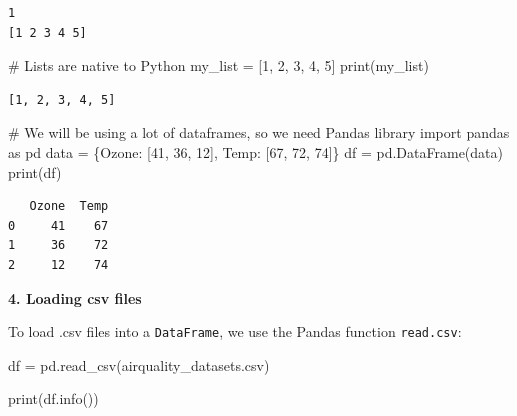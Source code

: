 \documentclass[
  letterpaper,
  DIV=11,
  numbers=noendperiod]{scrreprt}
\newenvironment{Shaded}{\begin{snugshade}}{\end{snugshade}}
\newcommand{\BuiltInTok}[1]{\textcolor[rgb]{0.00,0.23,0.31}{#1}}
\newcommand{\CommentTok}[1]{\textcolor[rgb]{0.37,0.37,0.37}{#1}}
\newcommand{\DecValTok}[1]{\textcolor[rgb]{0.68,0.00,0.00}{#1}}
\newcommand{\ImportTok}[1]{\textcolor[rgb]{0.00,0.46,0.62}{#1}}
\newcommand{\NormalTok}[1]{\textcolor[rgb]{0.00,0.23,0.31}{#1}}
\newcommand{\OperatorTok}[1]{\textcolor[rgb]{0.37,0.37,0.37}{#1}}
\newcommand{\StringTok}[1]{\textcolor[rgb]{0.13,0.47,0.30}{#1}}
\begin{document}
\begin{verbatim}
1
[1 2 3 4 5]
\end{verbatim}

\begin{Shaded}
\begin{Highlighting}[]
\CommentTok{\# Lists are native to Python}
\NormalTok{my\_list }\OperatorTok{=}\NormalTok{ [}\DecValTok{1}\NormalTok{, }\DecValTok{2}\NormalTok{, }\DecValTok{3}\NormalTok{, }\DecValTok{4}\NormalTok{, }\DecValTok{5}\NormalTok{]}
\BuiltInTok{print}\NormalTok{(my\_list)}
\end{Highlighting}
\end{Shaded}

\begin{verbatim}
[1, 2, 3, 4, 5]
\end{verbatim}

\begin{Shaded}
\begin{Highlighting}[]
\CommentTok{\# We will be using a lot of dataframes, so we need Pandas library}
\ImportTok{import}\NormalTok{ pandas }\ImportTok{as}\NormalTok{ pd}
\NormalTok{data }\OperatorTok{=}\NormalTok{ \{}\StringTok{\textquotesingle{}Ozone\textquotesingle{}}\NormalTok{: [}\DecValTok{41}\NormalTok{, }\DecValTok{36}\NormalTok{, }\DecValTok{12}\NormalTok{], }\StringTok{\textquotesingle{}Temp\textquotesingle{}}\NormalTok{: [}\DecValTok{67}\NormalTok{, }\DecValTok{72}\NormalTok{, }\DecValTok{74}\NormalTok{]\}}
\NormalTok{df }\OperatorTok{=}\NormalTok{ pd.DataFrame(data)}
\BuiltInTok{print}\NormalTok{(df)}
\end{Highlighting}
\end{Shaded}

\begin{verbatim}
   Ozone  Temp
0     41    67
1     36    72
2     12    74
\end{verbatim}

\textbf{4. Loading csv files}

To load .csv files into a \texttt{DataFrame}, we use the Pandas function
\texttt{read.csv}:

\begin{Shaded}
\begin{Highlighting}[]
\NormalTok{df }\OperatorTok{=}\NormalTok{ pd.read\_csv(}\StringTok{\textquotesingle{}airquality\_datasets.csv\textquotesingle{}}\NormalTok{)}
\end{Highlighting}
\end{Shaded}

\begin{Shaded}
\begin{Highlighting}[]
\BuiltInTok{print}\NormalTok{(df.info())}
\end{Highlighting}
\end{Shaded}
\end{document}
